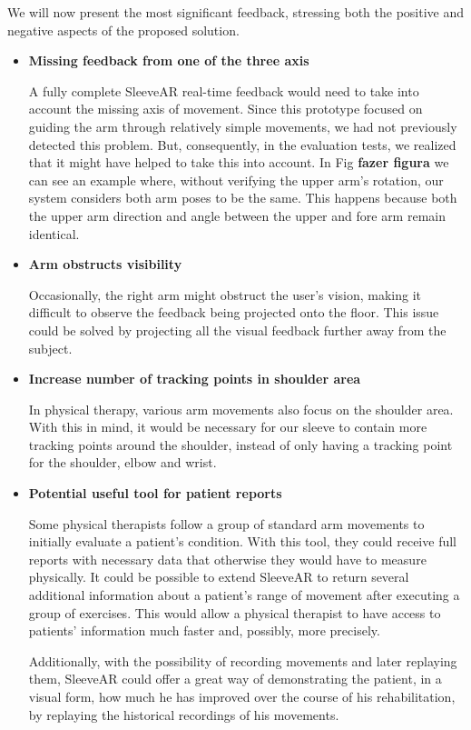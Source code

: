 We will now present the most significant feedback, stressing both the positive and negative aspects of the proposed solution.


\begin{itemize}
\item \textbf{Missing feedback from one of the three axis}

A fully complete SleeveAR real-time feedback would need to take into account the missing axis of movement. Since this prototype focused on guiding the arm through relatively simple movements, we had not previously detected this problem. But, consequently, in the evaluation tests, we realized that it might have helped to take this into account. In Fig \textbf{fazer figura} we can see an example where, without verifying the upper arm's rotation, our system considers both arm poses to be the same. This happens because both the upper arm direction and angle between the upper and fore arm remain identical.


\item \textbf{Arm obstructs visibility}

Occasionally, the right arm might obstruct the user's vision, making it difficult to observe the feedback being projected onto the floor. This issue could be solved by projecting all the visual feedback further away from the subject.

\item \textbf{Increase number of tracking points in shoulder area}

In physical therapy, various arm movements also focus on the shoulder area. With this in mind, it would be necessary for our sleeve to contain more tracking points around the shoulder, instead of only having a tracking point for the shoulder, elbow and wrist.

\item \textbf{Potential useful tool for patient reports}

Some physical therapists follow a group of standard arm movements to initially evaluate a patient's condition. With this tool, they could receive full reports with necessary data that otherwise they would have to measure physically. It could be possible to extend SleeveAR to return several additional information about a patient's range of movement after executing a group of exercises. This would allow a physical therapist to have access to patients' information much faster and, possibly, more precisely. 

Additionally, with the possibility of recording movements and later replaying them, SleeveAR could offer a great way of demonstrating the patient, in a visual form, how much he has improved over the course of his rehabilitation, by replaying the historical recordings of his movements.


\end{itemize}
